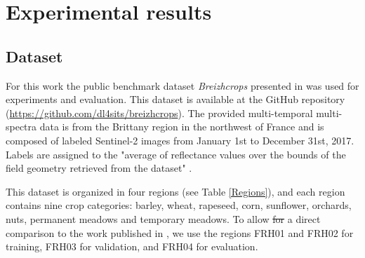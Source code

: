 \documentclass[journal,article,submit,pdftex,moreauthors]{Definitions/mdpi}
\providecommand{\DIFdel}[1]{{\protect\color{red}\sout{#1}}}                      %
\providecommand{\DIFdelbegin}{} %
\providecommand{\DIFdelend}{} %
\begin{document}
\section{Experimental results}
\subsection{Dataset}\label{dataset}
For this work the public benchmark dataset \textit{Breizhcrops} presented in \cite{Russwurm2020} was used for experiments and evaluation. This dataset is available at the GitHub repository
(\url{https://github.com/dl4sits/breizhcrops}). The provided multi-temporal multi-spectra data is from the Brittany region in the northwest of France and is composed of labeled Sentinel-2 images from January 1st to December 31st, 2017. Labels are assigned to the "average of reflectance values over the bounds of the field geometry retrieved from the dataset" \cite{Russwurm2020}.

This dataset is organized in four regions (see Table \ref{Regions}),
and each region contains nine crop categories: barley, wheat, rapeseed, corn, sunflower, orchards, nuts, permanent meadows and temporary meadows.
To allow \DIFdelbegin \DIFdel{for }\DIFdelend a direct comparison to the work published in \cite{Russwurm2020}, we use the regions FRH01 and FRH02 for training, FRH03 for validation, and FRH04 for evaluation.
\end{document}
